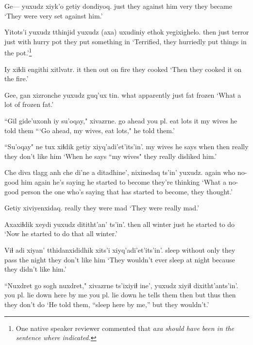 \documentclass[12pt]{article}
\begin{document}
\gll Ge--- yuxudz xiyk'o    getiy dondiyoq. 
{} just {they against him}  very  {they became}
\glt `They were very set against him.'
\glend

\gll Yitots'i yuxudz tthinjid yuxudz (axa)  uxudiniy ethok yegixighelo.
then just            terror   just   with hurry    pot   {they put something in}
\glt `Terrified, they hurriedly put things in the pot.'\footnote{One native speaker reviewer commented that \em axa \em should have been in the sentence where indicated.}
\glend

\gll Iy xiɬdi engithi  xitlvatr.
it then  {out on fire} {they cooked}
\glt `Then they cooked it on the fire.'
\glend

\gll Gee, gan xizronche yuxudz guq'ux tin.
{}        what  apparently      just   fat    frozen
\glt `What a lot of frozen fat.'
\glend

\gll ``Gil      gide'uxonh       iy su'oqay,"  xivazrne.
{go ahead} {you pl. eat lots} it {my wives} {he told them}
\glt ```Go ahead, my wives, eat lots," he told them.'
\glend

\gll ``Su'oqay" ne      tux  xiɬdik getiy  xiyq'adi'et'its'in'.
{my wives} {he says} when then   really {they don't like him}
\glt `When he says ``my wives" they really disliked him.'
\glend

\gll Che   diva tlagg   anh che   di'ne       a ditadhine', nixinedaq ts'in' yuxudz. 
again who  no-good him again {he's saying} {} {he started to become} {they're thinking}
\glt `What a no-good person the one who's saying that has started to become, they thought.'
\glend

\gll Getiy  xiviyenxidaq.
really {they were mad}
\glt `They were really mad.'
\glend

\gll Axaxiɬdik xeydi      yuxudz dititht'an'       ts'in'.
then         {all winter} just   {he started to do}
\glt `Now he started to do that all winter.'
\glend

\gll Viɬ   adi  xiyan'   tthidanxididhik     xits'i xiyq'adi'et'its'in'.
sleep without  only   {they pass the night} {} {they don't like him}
\glt `They wouldn't ever sleep at night because they didn't like him.'
\glend

\gll ``Nuxdret          go   sogh  nuxdret,"        xivazrne ts'ixiyiɬ ine', yuxudz xiyiɬ dixitht'ants'in'. 
{you pl. lie down} here {by me} {you pl. lie down} {he tells them} then but thus   then  {they don't do}
\glt `He told them, ``sleep here by me,'' but they wouldn't.'
\glend
\end{document}
